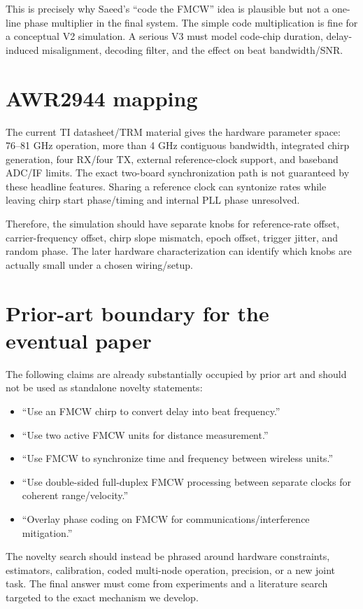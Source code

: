 \documentclass[11pt]{article}
\begin{document}
This is precisely why Saeed's ``code the FMCW'' idea is plausible but not a one-line phase multiplier in the final system. The simple code multiplication is fine for a conceptual V2 simulation. A serious V3 must model code-chip duration, delay-induced misalignment, decoding filter, and the effect on beat bandwidth/SNR.

\section{AWR2944 mapping}
The current TI datasheet/TRM material gives the hardware parameter space: 76--81 GHz operation, more than 4 GHz contiguous bandwidth, integrated chirp generation, four RX/four TX, external reference-clock support, and baseband ADC/IF limits. The exact two-board synchronization path is not guaranteed by these headline features. Sharing a reference clock can syntonize rates while leaving chirp start phase/timing and internal PLL phase unresolved.

Therefore, the simulation should have separate knobs for reference-rate offset, carrier-frequency offset, chirp slope mismatch, epoch offset, trigger jitter, and random phase. The later hardware characterization can identify which knobs are actually small under a chosen wiring/setup.

\section{Prior-art boundary for the eventual paper}
The following claims are already substantially occupied by prior art and should not be used as standalone novelty statements:
\begin{itemize}
\item ``Use an FMCW chirp to convert delay into beat frequency.''
\item ``Use two active FMCW units for distance measurement.''
\item ``Use FMCW to synchronize time and frequency between wireless units.''
\item ``Use double-sided full-duplex FMCW processing between separate clocks for coherent range/velocity.''
\item ``Overlay phase coding on FMCW for communications/interference mitigation.''
\end{itemize}

The novelty search should instead be phrased around hardware constraints, estimators, calibration, coded multi-node operation, precision, or a new joint task. The final answer must come from experiments and a literature search targeted to the exact mechanism we develop.
\end{document}
